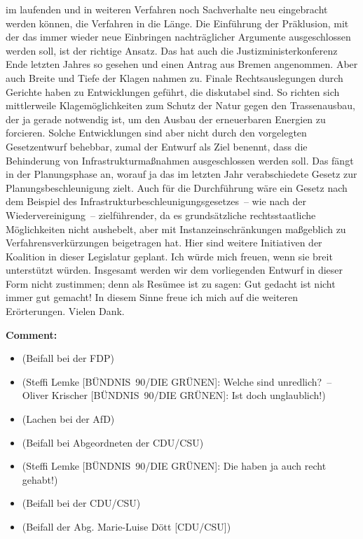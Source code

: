 \documentclass{article}
\begin{document}
im laufenden und in weiteren Verfahren noch Sachverhalte neu eingebracht werden können,  die Verfahren in die Länge. Die Einführung der Präklusion, mit der das immer wieder neue Einbringen nachträglicher Argumente ausgeschlossen werden soll, ist der richtige Ansatz.  Das hat auch die Justizministerkonferenz Ende letzten Jahres so gesehen und einen Antrag aus Bremen angenommen. Aber auch Breite und Tiefe der Klagen nahmen zu. Finale Rechtsauslegungen durch Gerichte haben zu Entwicklungen geführt, die diskutabel sind. So richten sich mittlerweile Klagemöglichkeiten zum Schutz der Natur gegen den Trassenausbau, der ja gerade notwendig ist, um den Ausbau der erneuerbaren Energien zu forcieren. Solche Entwicklungen sind aber nicht durch den vorgelegten Gesetzentwurf behebbar, zumal der Entwurf als Ziel benennt, dass die Behinderung von Infrastrukturmaßnahmen ausgeschlossen werden soll. Das fängt in der Planungsphase an, worauf ja das im letzten Jahr verabschiedete Gesetz zur Planungsbeschleunigung zielt. Auch für die Durchführung wäre ein Gesetz nach dem Beispiel des Infrastrukturbeschleunigungsgesetzes – wie nach der Wiedervereinigung – zielführender, da es grundsätzliche rechtsstaatliche Möglichkeiten nicht aushebelt, aber mit Instanzeinschränkungen maßgeblich zu Verfahrensverkürzungen beigetragen hat.  Hier sind weitere Initiativen der Koalition in dieser Legislatur geplant. Ich würde mich freuen, wenn sie breit unterstützt würden. Insgesamt werden wir dem vorliegenden Entwurf in dieser Form nicht zustimmen; denn als Resümee ist zu sagen: Gut gedacht ist nicht immer gut gemacht!  In diesem Sinne freue ich mich auf die weiteren Erörterungen. Vielen Dank.  

\noindent\textbf{Comment:}
\begin{itemize}
    \setlength\itemsep{-3pt}
    \item (Beifall bei der FDP)
    \setlength\itemsep{-3pt}
    \item (Steffi Lemke [BÜNDNIS 90/DIE GRÜNEN]: Welche sind unredlich? – Oliver Krischer [BÜNDNIS 90/DIE GRÜNEN]: Ist doch unglaublich!)
    \setlength\itemsep{-3pt}
    \item (Lachen bei der AfD)
    \setlength\itemsep{-3pt}
    \item (Beifall bei Abgeordneten der CDU/CSU)
    \setlength\itemsep{-3pt}
    \item (Steffi Lemke [BÜNDNIS 90/DIE GRÜNEN]: Die haben ja auch recht gehabt!)
    \setlength\itemsep{-3pt}
    \item (Beifall bei der CDU/CSU)
    \setlength\itemsep{-3pt}
    \item (Beifall der Abg. Marie-Luise Dött [CDU/CSU])
\end{itemize}
\end{document}
